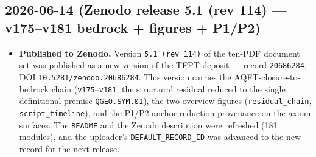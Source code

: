\documentclass[11pt]{article}
\providecommand{\vref}[1]{\texttt{#1}}
\begin{document}
\subsection*{2026-06-14 (Zenodo release 5.1 (rev 114) --- v175--v181 bedrock + figures + P1/P2)}
\begin{itemize}
\item \textbf{Published to Zenodo.} Version \texttt{5.1 (rev 114)} of the ten-PDF document set was
  published as a new version of the TFPT deposit --- record \texttt{20686284},
  DOI \texttt{10.5281/zenodo.20686284}. This version carries the AQFT-closure-to-bedrock chain
  (\vref{v175}--\vref{v181}, the structural residual reduced to the single definitional premise
  \texttt{QGEO.SYM.01}), the two overview figures (\texttt{residual\_chain}, \texttt{script\_timeline}),
  and the P1/P2 anchor-reduction provenance on the axiom surfaces. The \texttt{README} and the Zenodo
  description were refreshed (181 modules), and the uploader's \texttt{DEFAULT\_RECORD\_ID} was advanced
  to the new record for the next release.
\end{itemize}
\end{document}
